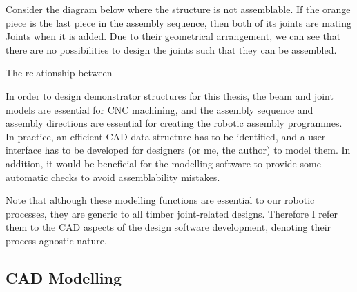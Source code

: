 Consider the diagram below where the structure is not assemblable. If the orange piece is the last piece in the assembly sequence, then both of its joints are mating Joints when it is added. Due to their geometrical arrangement, we can see that there are no possibilities to design the joints such that they can be assembled. 

The relationship between 

In order to design demonstrator structures for this thesis, the beam and joint models are essential for CNC machining, and the assembly sequence and assembly directions are essential for creating the robotic assembly programmes. In practice, an efficient CAD data structure has to be identified, and a user interface has to be developed for designers (or me, the author) to model them. In addition, it would be beneficial for the modelling software to provide some automatic checks to avoid assemblability mistakes. 

Note that although these modelling functions are essential to our robotic processes, they are generic to all timber joint-related designs. Therefore I refer them to the CAD aspects of the design software development, denoting their process-agnostic nature.

\subsection{CAD Modelling}
\label{subsection:exploration-2-cad-modelling}

